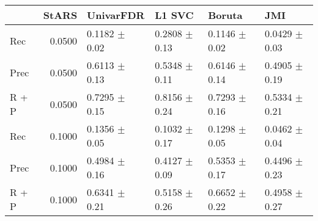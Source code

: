 \begin{tabular}{lrllll}
\toprule
{} &  StARS &          UnivarFDR &             L1 SVC &             Boruta &                JMI \\
\midrule
Rec   & 0.0500 &  0.1182 $\pm$ 0.02 &  0.2808 $\pm$ 0.13 &  0.1146 $\pm$ 0.02 &  0.0429 $\pm$ 0.03 \\
Prec  & 0.0500 &  0.6113 $\pm$ 0.13 &  0.5348 $\pm$ 0.11 &  0.6146 $\pm$ 0.14 &  0.4905 $\pm$ 0.19 \\
R + P & 0.0500 &  0.7295 $\pm$ 0.15 &  0.8156 $\pm$ 0.24 &  0.7293 $\pm$ 0.16 &  0.5334 $\pm$ 0.21 \\
Rec   & 0.1000 &  0.1356 $\pm$ 0.05 &  0.1032 $\pm$ 0.17 &  0.1298 $\pm$ 0.05 &  0.0462 $\pm$ 0.04 \\
Prec  & 0.1000 &  0.4984 $\pm$ 0.16 &  0.4127 $\pm$ 0.09 &  0.5353 $\pm$ 0.17 &  0.4496 $\pm$ 0.23 \\
R + P & 0.1000 &  0.6341 $\pm$ 0.21 &  0.5158 $\pm$ 0.26 &  0.6652 $\pm$ 0.22 &  0.4958 $\pm$ 0.27 \\
\bottomrule
\end{tabular}
